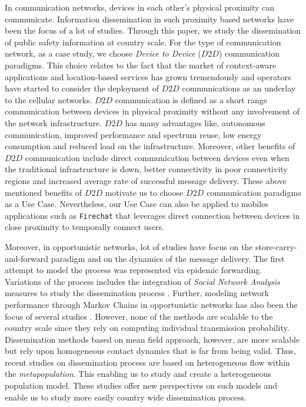 \documentclass[review]{elsarticle}
\begin{document}
In communication networks, devices in each other's physical proximity can communicate. Information dissemination in such proximity based networks have been the focus of a lot of studies. Through this paper, we study the dissemination of public safety information at country scale. For the type of communication network, as a case study, we choose \emph{Device to Device} ($D2D$) communication paradigms. This choice relates to the fact that the market of context-aware applications and location-based services has grown tremendously and operators have started to consider the deployment of $D2D$ communications as an underlay to the cellular networks. $D2D$ communication is defined as a short range communication between devices in physical proximity without any involvement of the network infrastructure. $D2D$ has many advantages like, autonomous communication, improved performance and spectrum reuse, low energy consumption and reduced load on the infrastructure. Moreover, other benefits of $D2D$ communication include direct communication between devices even when the traditional infrastructure is down, better connectivity in poor connectivity regions and increased average rate of successful message delivery. These above mentioned benefits of $D2D$ motivate us to choose $D2D$ communication paradigms as a Use Case. Nevertheless, our Use Case can also be applied to mobiles applications such as \texttt{Firechat} \cite{firechat} that leverages direct connection between devices in close proximity to temporally connect users.

Moreover, in opportunistic networks, lot of studies have focus on the store-carry-and-forward paradigm and on the dynamics of the message delivery. The first attempt to model the process was represented via epidemic forwarding. Variations of the process includes the integration of \emph{Social Network Analysis} measures to study the dissemination process \cite{5677535, 4674358, Mtibaa2013180, Belblidia20121786}. Further, modeling network performance through Markov Chains in opportunistic networks has also been the focus of several studies \cite{Groenevelt2005210,AlHanbali2008463,4430783, Boldrini201456}. However, none of the methods are scalable to the country scale since they rely on computing individual transmission probability. Dissemination methods based on mean field approach, however, are more scalable \cite{Zhang:2007:PME:1242848.1243153,1597221} but rely upon homogeneous contact dynamics that is far from being valid. Thus, recent studies \cite{colizzaepidemic2008, balcanphase2011, polettoheterogeneous2012, wanghow2013} on dissemination process are based on heterogeneous flow within the \emph{metapopulation}. This  enabling us to study and create a heterogeneous population model. These studies offer new perspectives on such models and enable us to study more easily country wide dissemination process.
\end{document}
